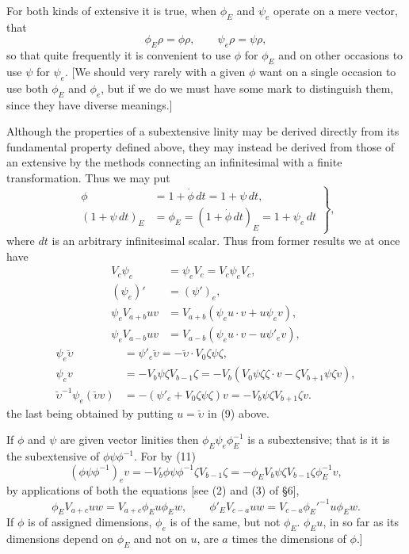 \documentclass[11pt]{article}
\begin{document}
\indent For both kinds of extensive it is true, when $\phi_E$ and $\psi_e$ operate on a mere vector, that
\begin{equation}\phi_E\rho=\phi\rho,\qquad\psi_e\rho=\psi\rho,\tag{4}\end{equation}
so that quite frequently it is convenient to use $\phi$ for $\phi_E$ and on other occasions to use $\psi$ for $\psi_e$. [We should very rarely with a given $\phi$ want on a single occasion to use both $\phi_E$ and $\phi_e$, but if we do we must have some mark to distinguish them, since they have diverse meanings.]

\indent Although the properties of a subextensive linity may be derived directly from its fundamental property defined above, they may instead be derived from those of an extensive by the methods connecting an infinitesimal with a finite transformation. Thus we may put
\begin{equation}\left.\begin{aligned}\phi&=1+\dot\phi\,dt=1+\psi\,dt,\\(1+\psi\,dt)_E&=\phi_E=(1+\dot\phi\,dt)_E=1+\psi_e\,dt\end{aligned}\right\},\tag{5}\end{equation}
where $dt$ is an arbitrary infinitesimal scalar. Thus from former results we at once have
\begin{align}V_c\psi_e&=\psi_eV_c=V_c\psi_eV_c,\tag{6}\\(\psi_e)'&=(\psi')_e,\tag{7}\\\psi_eV_{a+b}uv&=V_{a+b}(\psi_eu\cdot v+u\psi_ev),\tag{8}\\\psi_eV_{a-b}uv&=V_{a-b}(\psi_eu\cdot v-u\psi'_ev),\tag{9}\end{align}
\begin{align}
\psi_e\breve\upsilon&=\psi'_e\breve\upsilon=-\breve\upsilon\cdot V_0\zeta\psi\zeta,\tag{10}\\
\psi_ev&=-V_b\psi\zeta V_{b-1}\zeta
  =-V_b(V_0\psi\zeta\zeta\cdot v-\zeta V_{b+1}\psi\zeta v),\tag{11}\\
\breve\upsilon^{-1}\psi_e(\breve\upsilon v)&=-(\psi'_e+V_0\zeta\psi\zeta)v
  =-V_b\psi\zeta V_{b+1}\zeta v.\tag{12}
\end{align}
the last being obtained by putting $u=\breve\upsilon$ in (9) above.

If $\phi$ and $\psi$ are given vector linities then $\phi_E\psi_e\phi_E^{-1}$ is a subextensive; that is it is the subextensive of $\phi\psi\phi^{-1}$. For by (11)
\[(\phi\psi\phi^{-1})_ev=-V_b\phi\psi\phi^{-1}\zeta V_{b-1}\zeta
 =-\phi_EV_b\psi\zeta V_{b-1}\zeta\phi_E^{-1}v,\]
by applications of both the equations [see (2) and (3) of §6],
\[\phi_EV_{a+c}uw=V_{a+c}\phi_Eu\phi_Ew,\qquad
\phi'_EV_{c-a}uw=V_{c-a}\phi_E'^{-1}u\phi_Ew.\]
If $\phi$ is of assigned dimensions, $\phi_e$ is of the same, but not $\phi_E$. $\phi_Eu$, in so far as its dimensions depend on $\phi_E$ and not on $u$, are $a$ times the dimensions of $\phi$.]
\end{document}
